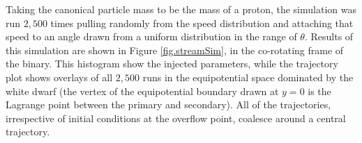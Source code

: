 \documentclass[preprint2]{aastex}
\newcommand{\note}[1]{[$\blacktriangleright$~\textbf{#1}~$\blacktriangleleft$]}
\begin{document}

Taking the canonical particle mass to be the mass of a proton, the
simulation was run $2,500$ times pulling randomly from the speed
distribution and attaching that speed to an angle drawn from a uniform
distribution in the range of $\theta$.  Results of this simulation are
shown in Figure \ref{fig.streamSim}, in the co-rotating frame of
the binary.  This histogram show the injected parameters, while the
trajectory plot shows overlays of all $2,500$ runs in the
equipotential space dominated by the white dwarf (the vertex of the
equipotential boundary drawn at $y = 0$ is the Lagrange point between
the primary and secondary).  All of the trajectories, irrespective of
initial conditions at the overflow point, coalesce around a central
trajectory.
\end{document}

